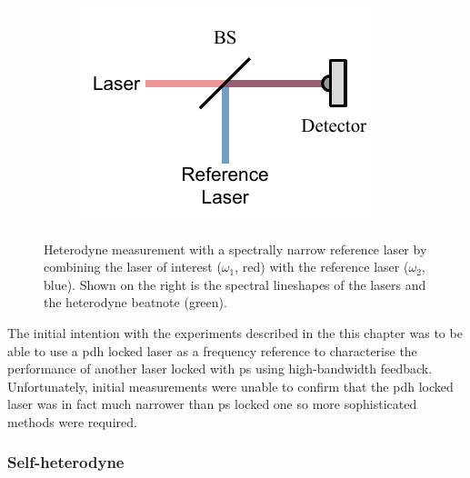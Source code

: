 \begin{figure}
    \begin{subfigure}{0.49\linewidth}
    \includegraphics{part1/Figs/HeterodyneReferenceLaser.pdf}
    \end{subfigure}
    \begin{subfigure}{0.49\linewidth}
    
    \end{subfigure}
    \caption[Heterodyne measurement with a spectrally narrow reference laser.]{Heterodyne measurement with a spectrally narrow reference laser by combining the laser of interest ($\omega_1$, red) with the reference laser ($\omega_2$, blue). Shown on the right is the spectral lineshapes of the lasers and the heterodyne beatnote (green).}
    \label{figure:heterodyne_reference}
\end{figure}

The initial intention with the experiments described in the this chapter was to be able to use a \gls{pdh} locked laser as a frequency reference to characterise the performance of another laser locked with \gls{ps} using high-bandwidth feedback.
Unfortunately, initial measurements were unable to confirm that the \gls{pdh} locked laser was in fact much narrower than \gls{ps} locked one so more sophisticated methods were required.

\subsubsection{Self-heterodyne}

